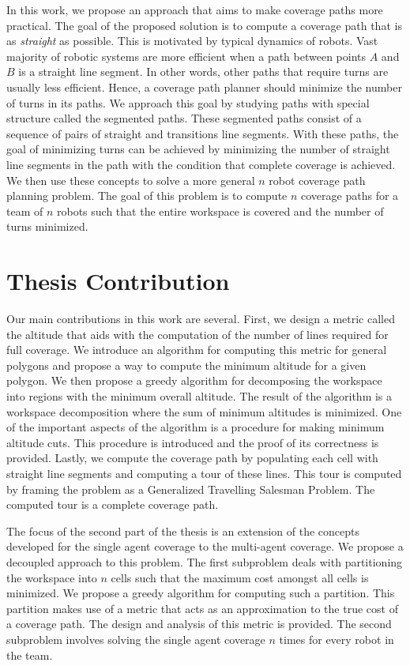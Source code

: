 \documentclass[../main.tex]{subfiles}
\begin{document}
In this work, we propose an approach that aims to make coverage paths more practical. The goal of the proposed solution is to compute a coverage path that is as \emph{straight} as possible. This is motivated by typical dynamics of robots. Vast majority of robotic systems are more efficient when a path between points $A$ and $B$ is a straight line segment. In other words, other paths that require turns are usually less efficient. Hence, a coverage path planner should minimize the number of turns in its paths. We approach this goal by studying paths with special structure called the segmented paths. These segmented paths consist of a sequence of pairs of straight and transitions line segments. With these paths, the goal of minimizing turns can be achieved by minimizing the number of straight line segments in the path with the condition that complete coverage is achieved. We then use these concepts to solve a more general $n$ robot coverage path planning problem. The goal of this problem is to compute $n$ coverage paths for a team of $n$ robots such that the entire workspace is covered and the number of turns minimized.

\section{Thesis Contribution}
\label{section:thesis_contribution}

Our main contributions in this work are several. First, we design a metric called the altitude that aids with the computation of the number of lines required for full coverage. We introduce an algorithm for computing this metric for general polygons and propose a way to compute the minimum altitude for a given polygon. We then propose a greedy algorithm for decomposing the workspace into regions with the minimum overall altitude. The result of the algorithm is a workspace decomposition where the sum of minimum altitudes is minimized. One of the important aspects of the algorithm is a procedure for making minimum altitude cuts. This procedure is introduced and the proof of its correctness is provided. Lastly, we compute the coverage path by populating each cell with straight line segments and computing a tour of these lines. This tour is computed by framing the problem as a Generalized Travelling Salesman Problem. The computed tour is a complete coverage path. 

The focus of the second part of the thesis is an extension of the concepts developed for the single agent coverage to the multi-agent coverage. We propose a decoupled approach to this problem. The first subproblem deals with partitioning the workspace into $n$ cells such that the maximum cost amongst all cells is minimized. We propose a greedy algorithm for computing such a partition. This partition makes use of a metric that acts as an approximation to the true cost of a coverage path. The design and analysis of this metric is provided. The second subproblem involves solving the single agent coverage $n$ times for every robot in the team.
\end{document}
